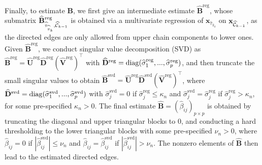 \documentclass[12pt]{article}
\def\diag{\mathop{\rm diag}}
\newcommand{\BB}{\mathbf B}
\newcommand{\DD}{\mathbf D}
\newcommand{\UU}{\mathbf U}
\newcommand{\VV}{\mathbf V}
\newcommand{\xx}{\mathbf x}
\newcommand{\1}{\uppercase\expandafter{\romannumeral1}}
\newcommand{\2}{\uppercase\expandafter{\romannumeral2}}
\newcommand{\0}{\textbf{0}}
\begin{document}
Finally, to estimate $\BB$, we first give an intermediate estimate $\widehat{\BB}^{\text{reg}}$, whose submatrix $\widehat{\BB}^{\text{reg}}_{\widehat{\tau}_{\widehat{\pi}_k}, \widehat{\cal C}_{k-1}}$ is obtained via a multivariate regression of $\xx_{\widehat{\tau}_{\widehat{\pi}_k}}$ on $\xx_{\widehat{\cal C}_{k-1}}$, as the directed edges are only allowed from upper chain components to lower ones. Given $\widehat{\BB}^{\text{reg}}$, we conduct singular value decomposition (SVD) as $\widehat{\BB}^{\text{reg}}=\widehat{\UU}^{\text{reg}}\widehat{\DD}^{\text{reg}}(\widehat{\VV}^{\text{reg}})^\top$ with $\widehat{\DD}^{\text{reg}}=\diag(\widehat{\sigma}_1^{\text{reg}},...,\widehat{\sigma}_p^{\text{reg}})$, and then truncate the small singular values to obtain $\widehat{\BB}^{\text{svd}}=\widehat{\UU}^{\text{reg}}\widehat{\DD}^{\text{svd}}(\widehat{\VV}^{\text{reg}})^\top$, where   $\widehat{\DD}^{\text{svd}}=\diag(\widehat{\sigma}_1^{\text{svd}},...,\widehat{\sigma}_p^{\text{svd}})$ with $\widehat{\sigma}_j^{\text{svd}}=0$ if $\widehat{\sigma}_j^{\text{reg}}\leq\kappa_n$ and $\widehat{\sigma}_j^{\text{svd}}=\widehat{\sigma}_j^{\text{reg}}$ if $\widehat{\sigma}_j^{\text{reg}}>\kappa_n$, for some pre-specified $\kappa_n>0$. 
The final estimate $\widehat{\BB}=(\widehat{\beta}_{ij})_{p\times p}$ is obtained by truncating the diagonal and upper triangular blocks to 0, and conducting a hard thresholding to the lower triangular blocks with some pre-specified $\nu_n>0$, where $\widehat{\beta}_{ij}=0$ if $|\widehat{\beta}_{ij}^{\text{svd}}|\leq \nu_n$ and $\widehat{\beta}_{ij}=\widehat{\beta}_{ij}^{\text{svd}}$ if $|\widehat{\beta}_{ij}^{\text{svd}}|> \nu_n$. 
The nonzero elements of $\widehat{\BB}$ then lead to the estimated directed edges. 
\end{document}

